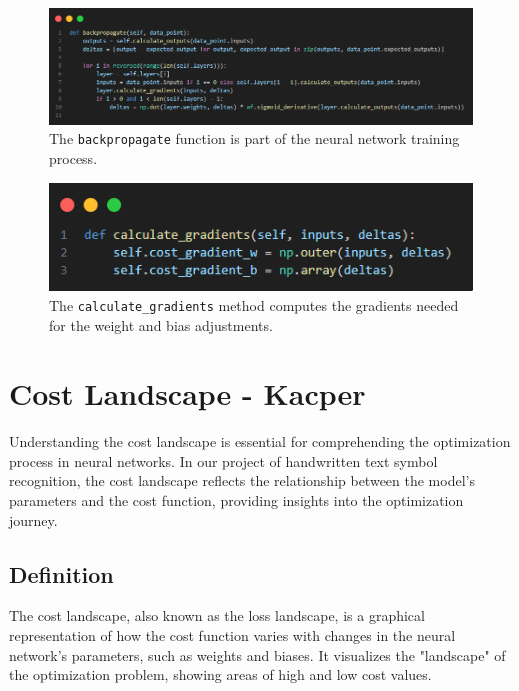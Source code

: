 \documentclass{article}
\begin{document}
\begin{figure}[ht]
    \centering 
    \includegraphics[width=1\textwidth]{images/backpropagate.png}
    \caption{The \texttt{backpropagate} function is part of the neural network training process.}
    \label{fig:backpropagation}
\end{figure}

\begin{figure}[ht]
    \centering 
    \includegraphics[width=1\textwidth]{images/calculate-gradients.png}
    \caption{The \texttt{calculate\_gradients} method computes the gradients needed for the weight and bias adjustments.}
    \label{fig:calculate_gradients}
\end{figure}

\newpage
\section{Cost Landscape - Kacper}

Understanding the cost landscape is essential for comprehending the optimization process in neural networks. In our project of handwritten text symbol recognition, the cost landscape reflects the relationship between the model's parameters and the cost function, providing insights into the optimization journey.

\subsection{Definition}
The cost landscape, also known as the loss landscape, is a graphical representation of how the cost function varies with changes in the neural network's parameters, such as weights and biases. It visualizes the "landscape" of the optimization problem, showing areas of high and low cost values.
\end{document}
